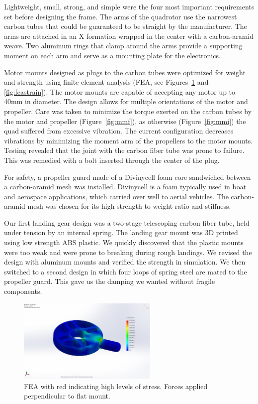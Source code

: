 \documentclass[12pt,letterpaper]{article} \usepackage[margin=1in]{geometry}
\begin{document}
Lightweight, small, strong, and simple were the four most important
requirements set before designing the frame. The arms of the quadrotor use the
narrowest carbon tubes that could be guaranteed to be straight by the
manufacturer. The arms are attached in an X formation wrapped in the center
with a carbon-aramid weave. Two aluminum rings that clamp around the arms
provide a supporting moment on each arm and serve as a mounting plate for the
electronics.

Motor mounts designed as plugs to the carbon tubes were optimized for weight
and strength using finite element analysis (FEA, see
Figures~\ref{fig:feastress} and \ref{fig:feastrain}). The motor mounts are
capable of accepting any motor up to 40mm in diameter. The design allows for
multiple orientations of the motor and propeller. Care was taken to minimize
the torque exerted on the carbon tubes by the motor and propeller
(Figure~\ref{fig:mmf}), as otherwise (Figure~\ref{fig:mmi}) the quad suffered
from excessive vibration. The current configuration decreases vibrations by
minimizing the moment arm of the propellers to the motor mounts. Testing
revealed that the joint with the carbon fiber tube was prone to failure. This
was remedied with a bolt inserted through the center of the plug.

For safety, a propeller guard made of a Divinycell foam core sandwiched between
a carbon-aramid mesh was installed. Divinycell is a foam typically used in boat
and aerospace applications, which carried over well to aerial vehicles. The
carbon-aramid mesh was chosen for its high strength-to-weight ratio and
stiffness.

Our first landing gear design was a two-stage telescoping carbon fiber tube,
held under tension by an internal spring. The landing gear mount was 3D printed
using low strength ABS plastic. We quickly discovered that the plastic mounts
were too weak and were prone to breaking during rough landings. We revised the
design with aluminum mounts and verified the strength in simulation. We then
switched to a second design in which four loops of spring steel are mated to
the propeller guard. This gave us the damping we wanted without fragile
components.

\begin{figure}[!h]
	\centering
	\includegraphics[width=0.6\textwidth]{img/fea_stress.jpg}
	\caption{FEA with red indicating high levels of stress. Forces applied
	perpendicular to flat mount.}
	\label{fig:feastress}
\end{figure}
 
\end{document}
